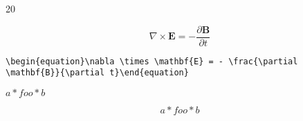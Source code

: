 20

\begin{equation}\nabla \times \mathbf{E} = - \frac{\partial \mathbf{B}}{\partial t}\end{equation}

\texttt{\textbackslash{}begin\{equation\}\textbackslash{}nabla \textbackslash{}times \textbackslash{}mathbf\{E\} = - \textbackslash{}frac\{\textbackslash{}partial \textbackslash{}mathbf\{B\}\}\{\textbackslash{}partial t\}\textbackslash{}end\{equation\}}

$a *foo* b$

\[a *foo* b\]



